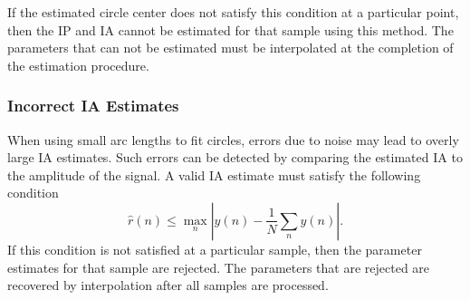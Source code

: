 \documentclass[a4paper]{IEEEtran}
\begin{document}
If the estimated circle center does not satisfy this condition at a particular point, then the IP and IA cannot be estimated for that sample using this method. The parameters that can not be estimated must be interpolated at the completion of the estimation procedure. 

\subsubsection{Incorrect IA Estimates}
When using small arc lengths to fit circles, errors due to noise may lead to overly large IA estimates. Such errors can be detected by comparing the estimated IA to the amplitude of the signal. A valid IA estimate must satisfy the following condition
\begin{equation}\label{eq:bound_on_IA_estimate}
	\hat{r}(n) \leq \max_n\left|y(n)-\frac{1}{N}\sum_ny(n)\right|.
\end{equation}
If this condition is not satisfied at a particular sample, then the parameter estimates for that sample are rejected. The parameters that are rejected are recovered by interpolation after all samples are processed.   
\end{document}
